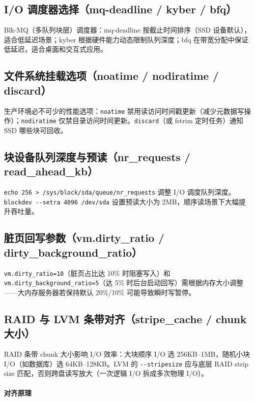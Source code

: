 \documentclass[12pt,UTF8]{ctexbook}
\begin{document}
    \subsection{I/O 调度器选择（mq-deadline / kyber / bfq）}

Blk-MQ（多队列块层）调度器：mq-deadline 按截止时间排序（SSD 设备默认），适合低延迟场景；kyber 根据硬件能力动态限制队列深度；bfq 在带宽分配中保证低延迟，适合桌面和交互式应用。

    \subsection{文件系统挂载选项（noatime / nodiratime / discard）}

生产环境必不可少的性能选项：\verb|noatime| 禁用读访问时间戳更新（减少元数据写操作）；\verb|nodiratime| 仅禁目录访问时间更新。\verb|discard|（或 fstrim 定时任务）通知 SSD 哪些块可回收。

    \subsection{块设备队列深度与预读（nr\_requests / read\_ahead\_kb）}

\verb|echo 256 > /sys/block/sda/queue/nr_requests| 调整 I/O 调度队列深度。\verb|blockdev --setra 4096 /dev/sda| 设置预读大小为 2MB，顺序读场景下大幅提升吞吐量。

    \subsection{脏页回写参数（vm.dirty\_ratio / dirty\_background\_ratio）}

\verb|vm.dirty_ratio=10|（脏页占比达 10\% 时阻塞写入）和 \verb|vm.dirty_background_ratio=5|（达 5\% 时后台启动回写）需根据内存大小调整——大内存服务器若保持默认 20\%/10\% 可能导致瞬时写暂停。

    \subsection{RAID 与 LVM 条带对齐（stripe\_cache / chunk 大小）}

RAID 条带 chunk 大小影响 I/O 效率：大块顺序 I/O 选 256KB--1MB，随机小块 I/O（如数据库）选 64KB--128KB。LVM 的 \verb|--stripesize| 应与底层 RAID strip size 匹配，否则跨盘读写放大（一次逻辑 I/O 拆成多次物理 I/O）。

\paragraph{对齐原理}
\end{document}
